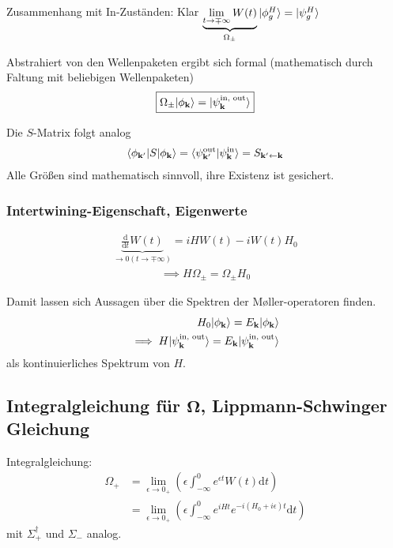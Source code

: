 \documentclass[11pt,a4paper]{report}
\begin{document}
Zusammenhang mit In-Zuständen: 
Klar $\underbrace{\lim_{t \rightarrow \mp \infty} W(t)}_{\Omega_\pm} |\phi_g^H\rangle = |\psi_g^H\rangle$

Abstrahiert von den Wellenpaketen ergibt sich formal (mathematisch durch Faltung mit beliebigen Wellenpaketen) 
\begin{align*}
    \boxed{\Omega_\pm |\phi_{\mathbf{k}}\rangle = |\psi_{\mathbf{k}}^{\text{in, out}}\rangle}
\end{align*}

Die $S$-Matrix folgt analog
\begin{align*}
    \langle \phi_{\mathbf{k}'}|S|\phi_{\mathbf{k}}\rangle = \langle \psi_{\mathbf{k}'}^{\text{out}}|\psi_{\mathbf{k}}^{\text{in}}\rangle = S_{\mathbf{k}' \leftarrow \mathbf{k}}
\end{align*}
Alle Größen sind mathematisch sinnvoll, ihre Existenz ist gesichert.

\subsubsection{Intertwining-Eigenschaft, Eigenwerte}

\begin{align*}
    \underbrace{\frac{\mathrm{d}}{\mathrm{d}t}W(t)}_{\rightarrow 0 (t \rightarrow \mp \infty)} = i H W(t) - i W(t) H_0 
\end{align*}
\begin{align*}
    \implies \boxed{H \Omega_\pm = \Omega_\pm H_0}
\end{align*}

Damit lassen sich Aussagen über die Spektren der M{\o}ller-operatoren finden.
\begin{align*}
    H_0 |\phi_{\mathbf{k}}\rangle = E_{\mathbf{k}} |\phi_{\mathbf{k}}\rangle \\
    \implies H |\psi_{\mathbf{k}}^{\text{\text{in, out}}}\rangle = E_{\mathbf{k}} |\psi_{\mathbf{k}}^{\text{\text{in, out}}}\rangle
\end{align*}
als kontinuierliches Spektrum von $H$.

\subsection[Integralgleichung für $\Omega$, Lippmann-Schwinger Gleichung]{Integralgleichung für $\mathbf{\Omega}$, Lippmann-Schwinger Gleichung}

Integralgleichung: 
\begin{align*}
    \Omega_+ &= \lim_{\epsilon \rightarrow 0_+} \left(\epsilon \int_{-\infty}^0 e^{\epsilon t} W(t) \mathrm{d}t \right) \\
    &= \lim_{\epsilon \rightarrow 0_+} \left(\epsilon \int_{-\infty}^0 e^{i H t} e^{-i (H_0 + i \epsilon) t} \mathrm{d}t \right)
\end{align*}
mit $\Sigma_+^\dagger$ und $\Sigma_-$ analog.
\end{document}
